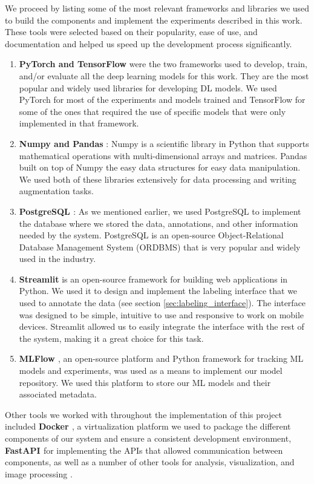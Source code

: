 \documentclass[../main.tex]{subfiles}
\begin{document}
    We proceed by listing some of the most relevant frameworks and libraries we used to build the components and implement the experiments described in this work. These tools were selected based on their popularity, ease of use, and documentation and helped us speed up the development process significantly.

    \vspace{0.5cm}
    
    \begin{enumerate}
        \item \textbf{PyTorch and TensorFlow} \cite{pytorch, tensorflow2015} were the two frameworks used to develop, train, and/or evaluate all the deep learning models for this work. They are the most popular and widely used libraries for developing DL models. We used PyTorch for most of the experiments and models trained and TensorFlow for some of the ones that required the use of specific models that were only implemented in that framework. 
        \item \textbf{Numpy and Pandas} \cite{numpy, pandas}: Numpy is a scientific library in Python that supports mathematical operations with multi-dimensional arrays and matrices. Pandas built on top of Numpy the easy data structures for easy data manipulation. We used both of these libraries extensively for data processing and writing augmentation tasks.
        \item \textbf{PostgreSQL \cite{postgresql}}: As we mentioned earlier, we used PostgreSQL to implement the database where we stored the data, annotations, and other information needed by the system.  PostgreSQL is an open-source Object-Relational Database Management System (ORDBMS) that is very popular and widely used in the industry.
        \item \textbf{Streamlit} \cite{streamlit} is an open-source framework for building web applications in Python. We used it to design and implement the labeling interface that we used to annotate the data (see section \ref{sec:labeling_interface}). The interface was designed to be simple, intuitive to use and responsive to work on mobile devices. Streamlit allowed us to easily integrate the interface with the rest of the system, making it a great choice for this task.
        \item \textbf{MLFlow \cite{mlflow}}, an open-source platform and Python framework for tracking ML models and experiments, was used as a means to implement our model repository. We used this platform to store our ML models and their associated metadata.
    \end{enumerate}
    \vspace{-0.4cm}
    Other tools we worked with throughout the implementation of this project included \textbf{Docker \cite{docker}}, a virtualization platform we used to package the different components of our system and ensure a consistent development environment, \textbf{FastAPI \cite{fastapi}} for implementing the APIs that allowed communication between components, as well as a number of other tools for analysis, visualization, and image processing \cite{matplotlib, scikit-learn, opencv}. 
\end{document}
